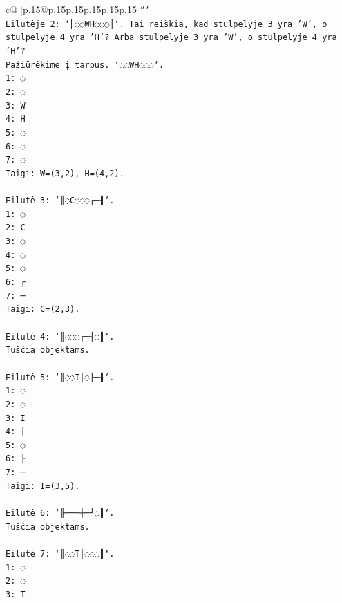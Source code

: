 \documentclass{article}
\begin{document}
{\begin{supertabular}{c@{$\;$}|p{.15\linewidth}@{}p{.15\linewidth}p{.15\linewidth}p{.15\linewidth}p{.15\linewidth}p{.15\linewidth}}
{{{\texttt{```} \\
\texttt{Eilutėje 2: `║◌◌WH◌◌◌║`. Tai reiškia, kad stulpelyje 3 yra 'W', o stulpelyje 4 yra 'H'? Arba stulpelyje 3 yra 'W', o stulpelyje 4 yra 'H'?} \\
\texttt{Pažiūrėkime į tarpus. `◌◌WH◌◌◌`.} \\
\texttt{1: ◌} \\
\texttt{2: ◌} \\
\texttt{3: W} \\
\texttt{4: H} \\
\texttt{5: ◌} \\
\texttt{6: ◌} \\
\texttt{7: ◌} \\
\texttt{Taigi: W=(3,2), H=(4,2).} \\
\\ 
\texttt{Eilutė 3: `║◌C◌◌◌┌─╢`.} \\
\texttt{1: ◌} \\
\texttt{2: C} \\
\texttt{3: ◌} \\
\texttt{4: ◌} \\
\texttt{5: ◌} \\
\texttt{6: ┌} \\
\texttt{7: ─} \\
\texttt{Taigi: C=(2,3).} \\
\\ 
\texttt{Eilutė 4: `║◌◌◌┌─┤◌║`.} \\
\texttt{Tuščia objektams.} \\
\\ 
\texttt{Eilutė 5: `║◌◌I│◌├─╢`.} \\
\texttt{1: ◌} \\
\texttt{2: ◌} \\
\texttt{3: I} \\
\texttt{4: │} \\
\texttt{5: ◌} \\
\texttt{6: ├} \\
\texttt{7: ─} \\
\texttt{Taigi: I=(3,5).} \\
\\ 
\texttt{Eilutė 6: `╟───┼─┘◌║`.} \\
\texttt{Tuščia objektams.} \\
\\ 
\texttt{Eilutė 7: `║◌◌T│◌◌◌║`.} \\
\texttt{1: ◌} \\
\texttt{2: ◌} \\
\texttt{3: T} \\
}}}
\end{supertabular}}
\end{document}
